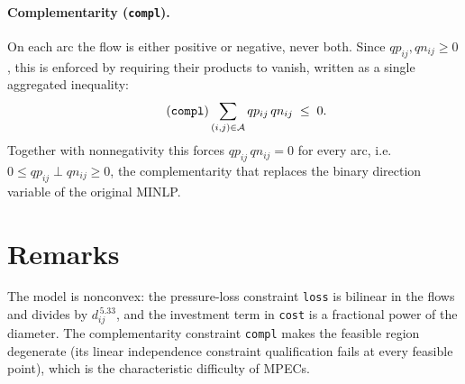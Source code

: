 \documentclass[11pt]{article}
\newcommand{\A}{\mathcal{A}}   %
\begin{document}
\paragraph{Complementarity (\texttt{compl}).}
On each arc the flow is either positive or negative, never both. Since
$qp_{ij}, qn_{ij}\ge 0$, this is enforced by requiring their products to vanish,
written as a single aggregated inequality:
\begin{equation}
\tag{\texttt{compl}}
\sum_{(i,j)\in\A} qp_{ij}\,qn_{ij} \;\le\; 0.
\end{equation}
Together with nonnegativity this forces $qp_{ij}\,qn_{ij}=0$ for every arc,
i.e.\ $0 \le qp_{ij} \perp qn_{ij} \ge 0$, the complementarity that replaces the
binary direction variable of the original MINLP.

\section{Remarks}

The model is nonconvex: the pressure-loss constraint \texttt{loss} is bilinear
in the flows and divides by $d_{ij}^{\,5.33}$, and the investment term in
\texttt{cost} is a fractional power of the diameter. The complementarity
constraint \texttt{compl} makes the feasible region degenerate (its linear
independence constraint qualification fails at every feasible point), which is
the characteristic difficulty of MPECs.
\end{document}
